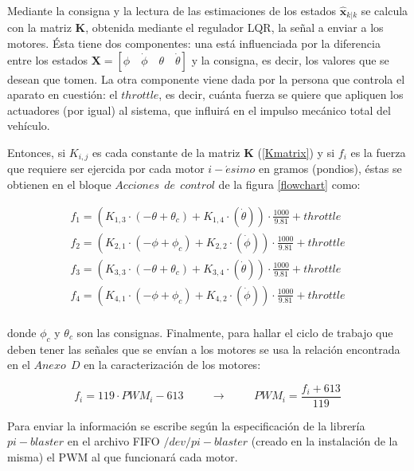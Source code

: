 \documentclass[twoside,11pt]{book}
\begin{document}
Mediante la consigna y la lectura de las estimaciones de los estados $\hat{\pmb{x}}_{k|k}$ se calcula con la matriz $\pmb{K}$, obtenida mediante el regulador LQR, la señal a enviar a los motores. Ésta tiene dos componentes: una está influenciada por la diferencia entre los estados  $\pmb{X}=[\phi \quad \dot{\phi} \quad \theta \quad \dot{\theta}]$ y la consigna, es decir, los valores que se desean que tomen. La otra componente viene dada por la persona que controla el aparato en cuestión: el $throttle$, es decir, cuánta fuerza se quiere que apliquen los actuadores (por igual) al sistema, que influirá en el impulso mecánico total del vehículo. 

Entonces, si $K_{i,j}$ es cada constante de la matriz $\pmb{K}$ (\ref{Kmatrix}) y si $f_i$ es la fuerza que requiere ser ejercida por cada motor $i-\acute{e}simo$ en gramos (pondios), éstas se obtienen en el bloque $Acciones\>\>de\>\>control$ de la figura \ref{flowchart} como: 

\begin{equation}
\begin{array}{l}
f_1=(K_{1,3}\cdot(-\theta+\theta_{c})+K_{1,4}\cdot(\dot{\theta}))\cdot \frac{1000}{9.81}+throttle \\
f_2=(K_{2,1}\cdot(-\phi+\phi_{c})+K_{2,2}\cdot(\dot{\phi}))\cdot \frac{1000}{9.81}+throttle \\
f_3=(K_{3,3}\cdot(-\theta+\theta_{c})+K_{3,4}\cdot(\dot{\theta}))\cdot \frac{1000}{9.81}+throttle \\
f_4=(K_{4,1}\cdot(-\phi+\phi_{c})+K_{4,2}\cdot(\dot{\phi}))\cdot \frac{1000}{9.81}+throttle \\ \end{array}
\end{equation}

donde $\phi_{c}$ y $\theta_{c}$ son las consignas. Finalmente, para hallar el ciclo de trabajo que deben tener las señales que se envían a los motores se usa la relación encontrada en el $Anexo\>\>D$ en la caracterización de los motores:

\begin{equation}
f_{i}=119\cdot PWM_{i} -613 \hspace{1cm} \longrightarrow \hspace{1cm}  PWM_{i}=\frac{f_{i}+613}{119}
\end{equation}

Para enviar la información se escribe según la especificación de la librería $pi-blaster$ en el archivo FIFO $/dev/pi-blaster$ (creado en la instalación de la misma) el PWM al que funcionará cada motor.
\end{document}
